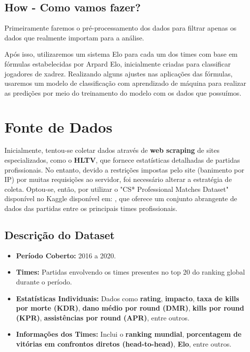 \documentclass[a4paper,times,12pt]{article}
\begin{document}
\subsection*{How - Como vamos fazer?}
\hspace{+15pt}
Primeiramente faremos o pré-processamento dos dados para filtrar apenas os dados que realmente importam para a análise.

Após isso, utilizaremos um sistema Elo para cada um dos times com base em fórmulas estabelecidas por Arpard Elo, inicialmente criadas para classificar jogadores de xadrez.
Realizando alguns ajustes nas aplicações das fórmulas, usaremos um modelo de classificação com aprendizado de máquina para realizar as predições por meio do treinamento do modelo com os dados que possuímos.


\section{Fonte de Dados}
\hspace{+15pt}
Inicialmente, tentou-se coletar dados através de \textbf{web scraping} de sites especializados, como o \textbf{HLTV}, que fornece estatísticas detalhadas de partidas profissionais. No entanto, devido a restrições impostas pelo site (banimento por IP) por muitas requisições ao servidor, foi necessário alterar a estratégia de coleta. Optou-se, então, por utilizar o "CS* Professional Matches Dataset" disponível no Kaggle  disponível em: \cite{Kaggle}, que oferece um conjunto abrangente de dados das partidas entre os principais times profissionais.
\subsection{Descrição do Dataset}
\begin{itemize}
  \item \textbf{Período Coberto:} 2016 a 2020.
  \item \textbf{Times:} Partidas envolvendo os times presentes no top 20 do ranking global durante o período.
  \item \textbf{Estatísticas Individuais:} Dados como \textbf{rating}, \textbf{impacto}, \textbf{taxa de kills por morte (KDR)}, \textbf{dano médio por round (DMR)}, \textbf{kills por round (KPR)}, \textbf{assistências por round (APR)}, entre outros.
  \item \textbf{Informações dos Times:} Inclui o \textbf{ranking mundial}, \textbf{porcentagem de vitórias em confrontos diretos (head-to-head)}, \textbf{Elo}, entre outros.
\end{itemize}
\end{document}
